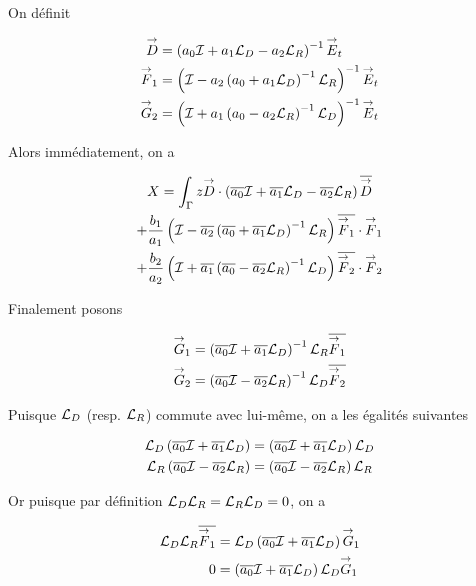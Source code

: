   On définit

  \newcommand{\vD}{\vect{D}}
  \newcommand{\vF}{\vect{F}}

  \begin{align}
    \vD & = \left(a_0 \oI + a_1 \LD - a_2\LR \right)^{-1} \vE_t
    \\
    \vF_1 & = \left(\oI - a_2 \left( a_0 + a_1\LD\right)^{-1}\LR\right)^{-1} \vE_t
    \\
    \vG_2 & = \left(\oI + a_1 \left( a_0 - a_2\LR\right)^{-1}\LD\right)^{-1} \vE_t
  \end{align}

  Alors immédiatement, on a 

  \begin{multline}
    X = \int_\Gamma z \vD \cdot \left(\conj{a_0} \oI + \conj{a_1} \LD - \conj{a_2}\LR\right)\conj{\vD}
    \\
    + \frac{b_1}{a_1} \left(\oI - \conj{a_2} \left( \conj{a_0} + \conj{a_1}\LD\right)^{-1}\LR\right)\conj{\vF_1}\cdot\vF_1
    \\
    + \frac{b_2}{a_2} \left(\oI + \conj{a_1} \left( \conj{a_0} - \conj{a_2}\LR\right)^{-1}\LD\right)\conj{\vF_2}\cdot\vF_2
  \end{multline}

  Finalement posons

  \newcommand{\vG}{\vect{G}}

  \begin{align}
    \vG_1 & = \left(\conj{a_0} \oI + \conj{a_1} \LD \right)^{-1}\LR \conj{\vF_1}
    \\
    \vG_2 & = \left(\conj{a_0} \oI - \conj{a_2} \LR \right)^{-1}\LD \conj{\vF_2}
  \end{align}

  Puisque \({\mathcal{L}_D}\) (resp. \({\mathcal{L}_R}\)) commute avec lui-même, on a les égalités suivantes

  \begin{align}
    {\mathcal{L}_D}\left({\overline{a_0}} {\mathcal{I}} + {\overline{a_1}} {\mathcal{L}_D} \right)&=\left({\overline{a_0}} {\mathcal{I}} + {\overline{a_1}} {\mathcal{L}_D} \right){\mathcal{L}_D}
    \\
    {\mathcal{L}_R}\left({\overline{a_0}} {\mathcal{I}} - {\overline{a_2}} {\mathcal{L}_R} \right)&=\left({\overline{a_0}} {\mathcal{I}} - {\overline{a_2}} {\mathcal{L}_R} \right){\mathcal{L}_R}
  \end{align}

  Or puisque par définition \({\mathcal{L}_D}{\mathcal{L}_R}={\mathcal{L}_R}{\mathcal{L}_D}=0\), on a

  \begin{align}
    \LD\LR\conj{\vF_1} &= \LD\left(\conj{a_0} \oI + \conj{a_1} \LD \right)\vG_1
    \\
    0 & =\left(\conj{a_0} \oI + \conj{a_1} \LD \right)\LD\vG_1
  \end{align}

